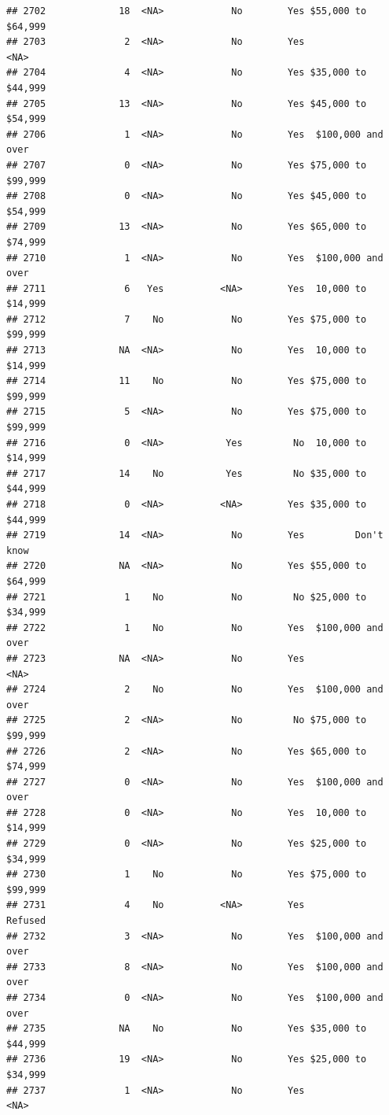 \documentclass[man]{apa6}
\begin{document}
\begin{verbatim}
## 2702             18  <NA>            No        Yes $55,000 to $64,999
## 2703              2  <NA>            No        Yes               <NA>
## 2704              4  <NA>            No        Yes $35,000 to $44,999
## 2705             13  <NA>            No        Yes $45,000 to $54,999
## 2706              1  <NA>            No        Yes  $100,000 and over
## 2707              0  <NA>            No        Yes $75,000 to $99,999
## 2708              0  <NA>            No        Yes $45,000 to $54,999
## 2709             13  <NA>            No        Yes $65,000 to $74,999
## 2710              1  <NA>            No        Yes  $100,000 and over
## 2711              6   Yes          <NA>        Yes  10,000 to $14,999
## 2712              7    No            No        Yes $75,000 to $99,999
## 2713             NA  <NA>            No        Yes  10,000 to $14,999
## 2714             11    No            No        Yes $75,000 to $99,999
## 2715              5  <NA>            No        Yes $75,000 to $99,999
## 2716              0  <NA>           Yes         No  10,000 to $14,999
## 2717             14    No           Yes         No $35,000 to $44,999
## 2718              0  <NA>          <NA>        Yes $35,000 to $44,999
## 2719             14  <NA>            No        Yes         Don't know
## 2720             NA  <NA>            No        Yes $55,000 to $64,999
## 2721              1    No            No         No $25,000 to $34,999
## 2722              1    No            No        Yes  $100,000 and over
## 2723             NA  <NA>            No        Yes               <NA>
## 2724              2    No            No        Yes  $100,000 and over
## 2725              2  <NA>            No         No $75,000 to $99,999
## 2726              2  <NA>            No        Yes $65,000 to $74,999
## 2727              0  <NA>            No        Yes  $100,000 and over
## 2728              0  <NA>            No        Yes  10,000 to $14,999
## 2729              0  <NA>            No        Yes $25,000 to $34,999
## 2730              1    No            No        Yes $75,000 to $99,999
## 2731              4    No          <NA>        Yes            Refused
## 2732              3  <NA>            No        Yes  $100,000 and over
## 2733              8  <NA>            No        Yes  $100,000 and over
## 2734              0  <NA>            No        Yes  $100,000 and over
## 2735             NA    No            No        Yes $35,000 to $44,999
## 2736             19  <NA>            No        Yes $25,000 to $34,999
## 2737              1  <NA>            No        Yes               <NA>

\end{verbatim}
\end{document}
